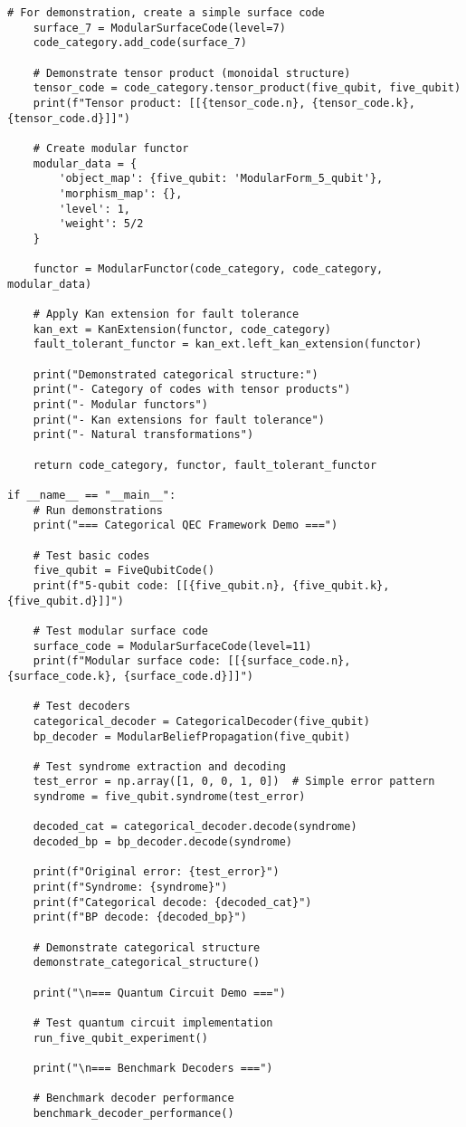 \documentclass[12pt,a4paper]{article}
\begin{document}
\begin{lstlisting}[style=python,caption=Advanced categorical structures for QEC]
    # For demonstration, create a simple surface code
    surface_7 = ModularSurfaceCode(level=7)
    code_category.add_code(surface_7)
    
    # Demonstrate tensor product (monoidal structure)
    tensor_code = code_category.tensor_product(five_qubit, five_qubit)
    print(f"Tensor product: [[{tensor_code.n}, {tensor_code.k}, {tensor_code.d}]]")
    
    # Create modular functor
    modular_data = {
        'object_map': {five_qubit: 'ModularForm_5_qubit'},
        'morphism_map': {},
        'level': 1,
        'weight': 5/2
    }
    
    functor = ModularFunctor(code_category, code_category, modular_data)
    
    # Apply Kan extension for fault tolerance
    kan_ext = KanExtension(functor, code_category)
    fault_tolerant_functor = kan_ext.left_kan_extension(functor)
    
    print("Demonstrated categorical structure:")
    print("- Category of codes with tensor products")
    print("- Modular functors")
    print("- Kan extensions for fault tolerance")
    print("- Natural transformations")
    
    return code_category, functor, fault_tolerant_functor

if __name__ == "__main__":
    # Run demonstrations
    print("=== Categorical QEC Framework Demo ===")
    
    # Test basic codes
    five_qubit = FiveQubitCode()
    print(f"5-qubit code: [[{five_qubit.n}, {five_qubit.k}, {five_qubit.d}]]")
    
    # Test modular surface code
    surface_code = ModularSurfaceCode(level=11)
    print(f"Modular surface code: [[{surface_code.n}, {surface_code.k}, {surface_code.d}]]")
    
    # Test decoders
    categorical_decoder = CategoricalDecoder(five_qubit)
    bp_decoder = ModularBeliefPropagation(five_qubit)
    
    # Test syndrome extraction and decoding
    test_error = np.array([1, 0, 0, 1, 0])  # Simple error pattern
    syndrome = five_qubit.syndrome(test_error)
    
    decoded_cat = categorical_decoder.decode(syndrome)
    decoded_bp = bp_decoder.decode(syndrome)
    
    print(f"Original error: {test_error}")
    print(f"Syndrome: {syndrome}")
    print(f"Categorical decode: {decoded_cat}")
    print(f"BP decode: {decoded_bp}")
    
    # Demonstrate categorical structure
    demonstrate_categorical_structure()
    
    print("\n=== Quantum Circuit Demo ===")
    
    # Test quantum circuit implementation
    run_five_qubit_experiment()
    
    print("\n=== Benchmark Decoders ===")
    
    # Benchmark decoder performance
    benchmark_decoder_performance()
\end{lstlisting}
\end{document}

